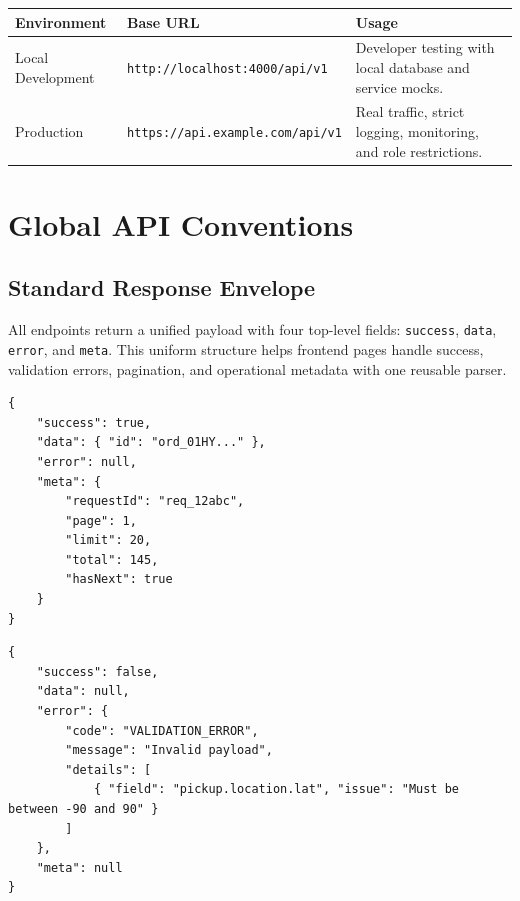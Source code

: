 \begin{tcolorbox}[
		enhanced,
		colback=LightGray,
		colframe=PrimaryBlue,
		arc=4pt,
		boxrule=0.8pt,
		left=10pt, right=10pt, top=6pt, bottom=6pt
]
\begin{tabularx}{\textwidth}{@{}p{3.2cm}p{4.8cm}X@{}}
\toprule
\textbf{Environment} & \textbf{Base URL} & \textbf{Usage} \\
\midrule
Local Development & \texttt{http://localhost:4000/api/v1} & Developer testing with local database and service mocks. \\
Production & \texttt{https://api.example.com/api/v1} & Real traffic, strict logging, monitoring, and role restrictions. \\
\bottomrule
\end{tabularx}
\end{tcolorbox}

\section{Global API Conventions}

\subsection{Standard Response Envelope}

All endpoints return a unified payload with four top-level fields:
\texttt{success}, \texttt{data}, \texttt{error}, and \texttt{meta}. This
uniform structure helps frontend pages handle success, validation errors,
pagination, and operational metadata with one reusable parser.

\begin{lstlisting}[caption={Unified success response format}]
{
	"success": true,
	"data": { "id": "ord_01HY..." },
	"error": null,
	"meta": {
		"requestId": "req_12abc",
		"page": 1,
		"limit": 20,
		"total": 145,
		"hasNext": true
	}
}
\end{lstlisting}

\begin{lstlisting}[caption={Unified error response format}]
{
	"success": false,
	"data": null,
	"error": {
		"code": "VALIDATION_ERROR",
		"message": "Invalid payload",
		"details": [
			{ "field": "pickup.location.lat", "issue": "Must be between -90 and 90" }
		]
	},
	"meta": null
}
\end{lstlisting}

